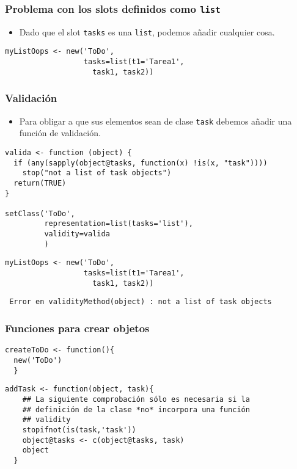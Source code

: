 \documentclass[xcolor={usenames,svgnames,dvipsnames}]{beamer}
\begin{document}
\begin{frame}[fragile]
\frametitle{Problema con los slots definidos como \texttt{list}}
\label{sec-3-1-8}

\begin{itemize}
\item Dado que el slot \texttt{tasks} es una \texttt{list}, podemos añadir cualquier
  cosa.
\end{itemize}

\lstset{language=R}
\begin{lstlisting}
myListOops <- new('ToDo',
                  tasks=list(t1='Tarea1',
                    task1, task2))
\end{lstlisting}
\end{frame}
\begin{frame}[fragile]
\frametitle{Validación}
\label{sec-3-1-9}

\begin{itemize}
\item Para obligar a que sus elementos sean de clase \texttt{task} debemos añadir
  una función de validación.
\end{itemize}

\lstset{language=R}
\begin{lstlisting}
valida <- function (object) {
  if (any(sapply(object@tasks, function(x) !is(x, "task")))) 
    stop("not a list of task objects")
  return(TRUE)
}

setClass('ToDo',
         representation=list(tasks='list'),
         validity=valida
         )
\end{lstlisting}



\lstset{language=R}
\begin{lstlisting}
myListOops <- new('ToDo',
                  tasks=list(t1='Tarea1',
                    task1, task2))
\end{lstlisting}

\begin{verbatim}
 Error en validityMethod(object) : not a list of task objects
\end{verbatim}
\end{frame}
\begin{frame}[fragile]
\frametitle{Funciones para crear objetos}
\label{sec-3-1-10}


\lstset{language=R}
\begin{lstlisting}
createToDo <- function(){
  new('ToDo')
  }
\end{lstlisting}



\lstset{language=R}
\begin{lstlisting}
addTask <- function(object, task){
    ## La siguiente comprobación sólo es necesaria si la
    ## definición de la clase *no* incorpora una función 
    ## validity
    stopifnot(is(task,'task'))
    object@tasks <- c(object@tasks, task)
    object
  }
\end{lstlisting}
\end{frame}
\end{document}
